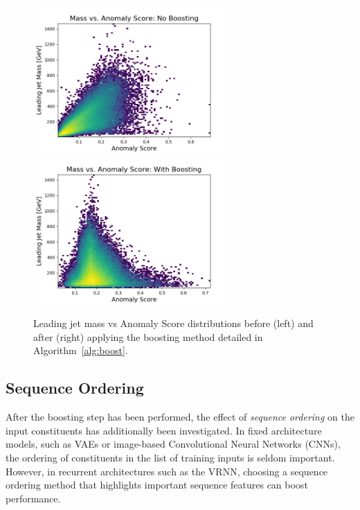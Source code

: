 \documentclass[11pt, a4paper]{article}
\begin{document}
\begin{figure}[H]
	\begin{center}
		\includegraphics[width=213pt]{imgs/ProcNoBoostPt_Background_July20_Background_July20_Weights_Leading_ConstOnly_Avg_M_vs_Score_ProcTest_SaveForPaper.png}
		\includegraphics[width=213pt]{imgs/ProcBoostPt_Background_July20_Background_July20_Weights_Leading_ConstOnly_Avg_M_vs_Score_ProcTest_SaveForPaper.png}
	\end{center}
	\caption{Leading jet mass vs Anomaly Score distributions before (left) and after (right) applying the boosting method detailed in Algorithm~\ref{alg:boost}.}
	\label{fig:mass_vs_score_boost}
\end{figure}


\subsection{Sequence Ordering}

After the boosting step has been performed, the effect of \textit{sequence ordering} on the input constituents has additionally been investigated. In fixed architecture models, such as VAEs or image-based Convolutional Neural Networks (CNNs), the ordering of constituents in the list of training inputs is seldom important. However, in recurrent architectures such as the VRNN, choosing a sequence ordering method that highlights important sequence features can boost performance.
 
\end{document}
